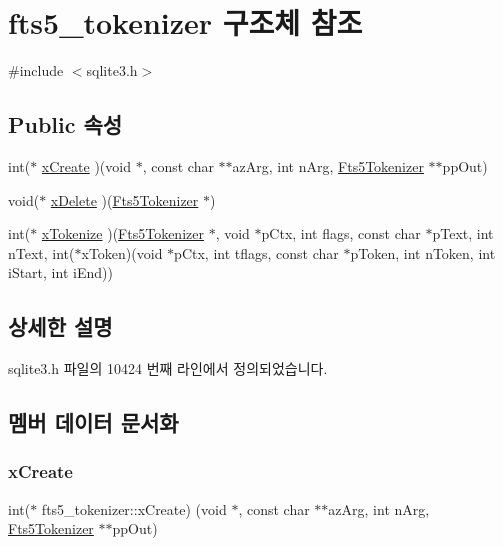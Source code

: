 \hypertarget{structfts5__tokenizer}{}\section{fts5\+\_\+tokenizer 구조체 참조}
\label{structfts5__tokenizer}


{\ttfamily \#include $<$sqlite3.\+h$>$}

\subsection*{Public 속성}
\begin{DoxyCompactItemize}
\item 
int($\ast$ \hyperlink{structfts5__tokenizer_a61846ad000b2d38a1264c342c8201d5c}{x\+Create} )(void $\ast$, const char $\ast$$\ast$az\+Arg, int n\+Arg, \hyperlink{sqlite3_8h_ac015f88c5332d612a3125fc0014e468c}{Fts5\+Tokenizer} $\ast$$\ast$pp\+Out)
\item 
void($\ast$ \hyperlink{structfts5__tokenizer_aaaa88b9f3e50f0b1120a05fb1bbb251f}{x\+Delete} )(\hyperlink{sqlite3_8h_ac015f88c5332d612a3125fc0014e468c}{Fts5\+Tokenizer} $\ast$)
\item 
int($\ast$ \hyperlink{structfts5__tokenizer_ae65ca5a9b1e6d5c1ef09731fccefa577}{x\+Tokenize} )(\hyperlink{sqlite3_8h_ac015f88c5332d612a3125fc0014e468c}{Fts5\+Tokenizer} $\ast$, void $\ast$p\+Ctx, int flags, const char $\ast$p\+Text, int n\+Text, int($\ast$x\+Token)(void $\ast$p\+Ctx, int tflags, const char $\ast$p\+Token, int n\+Token, int i\+Start, int i\+End))
\end{DoxyCompactItemize}


\subsection{상세한 설명}


sqlite3.\+h 파일의 10424 번째 라인에서 정의되었습니다.



\subsection{멤버 데이터 문서화}
\mbox{\label{structfts5__tokenizer_a61846ad000b2d38a1264c342c8201d5c}} 
\subsubsection{\texorpdfstring{x\+Create}{xCreate}}
{\footnotesize\ttfamily int($\ast$ fts5\+\_\+tokenizer\+::x\+Create) (void $\ast$, const char $\ast$$\ast$az\+Arg, int n\+Arg, \hyperlink{sqlite3_8h_ac015f88c5332d612a3125fc0014e468c}{Fts5\+Tokenizer} $\ast$$\ast$pp\+Out)}



